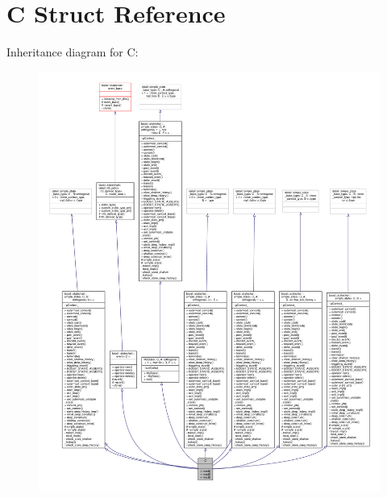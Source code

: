 \hypertarget{struct_c}{}\section{C Struct Reference}
\label{struct_c}


Inheritance diagram for C\+:
\nopagebreak
\begin{figure}[H]
\begin{center}
\leavevmode
\includegraphics[width=350pt]{struct_c__inherit__graph}
\end{center}
\end{figure}


